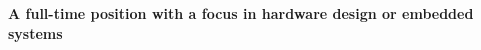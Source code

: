 
\begin{cvparagraph}
	{\fontsize{10pt}{1em}\bodyfont\bfseries\color{darktext} \hspace{3.0mm}A full-time position with a focus in hardware design or embedded systems}
\end{cvparagraph}
